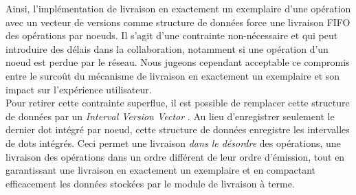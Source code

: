 Ainsi, l'implémentation de livraison en exactement un exemplaire d'une opération avec un vecteur de versions comme structure de données force une livraison \ac{FIFO} des opérations par noeuds.
Il s'agit d'une contrainte non-nécessaire et qui peut introduire des délais dans la collaboration, notamment si une opération d'un noeud est perdue par le réseau.
Nous jugeons cependant acceptable ce compromis entre le surcoût du mécanisme de livraison en exactement un exemplaire et son impact sur l'expérience utilisateur.\\

Pour retirer cette contrainte superflue, il est possible de remplacer cette structure de données par un \emph{Interval Version Vector} \cite{2014-optimized-or-sets}.
Au lieu d'enregistrer seulement le dernier dot intégré par noeud, cette structure de données enregistre les intervalles de dots intégrés.
Ceci permet une livraison \emph{dans le désordre} des opérations, \ie une livraison des opérations dans un ordre différent de leur ordre d'émission, tout en garantissant une livraison en exactement un exemplaire et en compactant efficacement les données stockées par le module de livraison à terme.
